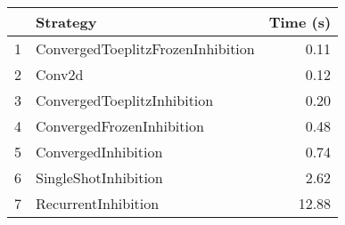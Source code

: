 \begin{tabular}{llr}
\toprule
{} &                           Strategy & Time (s) \\
\midrule
1 &  ConvergedToeplitzFrozenInhibition &     0.11 \\
2 &                             Conv2d &     0.12 \\
3 &        ConvergedToeplitzInhibition &     0.20 \\
4 &          ConvergedFrozenInhibition &     0.48 \\
5 &                ConvergedInhibition &     0.74 \\
6 &               SingleShotInhibition &     2.62 \\
7 &                RecurrentInhibition &    12.88 \\
\bottomrule
\end{tabular}
